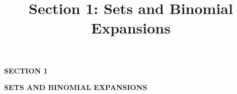 \documentclass[11pt]{article}
\title{\textbf{Section 1: Sets and Binomial Expansions}}
\author{}
\date{}
\begin{document}
\begin{titlepage}
\centering
\vspace*{4cm}
{\Huge\bfseries\color{sectionblue} SECTION 1\par}
\vspace{1cm}
{\LARGE\bfseries SETS AND BINOMIAL EXPANSIONS\par}
\end{titlepage}









\end{document}
